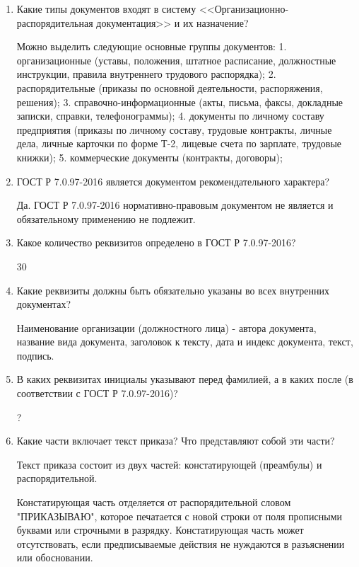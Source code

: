 \documentclass[a4paper,10pt]{article}
\theoremstyle{plain} %
\theoremstyle{definition} %
\theoremstyle{remark} %
\begin{document}
\begin{enumerate}

	\item Какие типы документов входят в систему <<Организационно-распорядительная документация>> и их назначение?
	
	Можно выделить следующие основные группы документов:
	1. организационные (уставы, положения, штатное расписание, должностные инструкции, правила внутреннего трудового распорядка);
	2. распорядительные (приказы по основной деятельности, распоряжения, решения);
	3. справочно-информационные (акты, письма, факсы, докладные записки, справки, телефонограммы);
	4. документы по личному составу предприятия (приказы по личному составу, трудовые контракты, личные дела, личные карточки по форме Т-2, лицевые счета по зарплате, трудовые книжки);
	5. коммерческие документы (контракты, договоры);
	

	\item ГОСТ Р 7.0.97-2016 является документом рекомендательного характера?
	
	Да. ГОСТ Р 7.0.97-2016 нормативно-правовым документом не является и обязательному применению не подлежит.

	\item Какое количество реквизитов определено в ГОСТ Р 7.0.97-2016?
	
	30

	\item Какие реквизиты должны быть обязательно указаны во всех внутренних
документах?

Наименование организации (должностного лица) - автора документа, название вида документа, заголовок к тексту, дата и индекс документа, текст, подпись.

	\item В каких реквизитах инициалы указывают перед фамилией, а в каких после (в соответствии с ГОСТ Р 7.0.97-2016)?
	
	?
	
	\item Какие части включает текст приказа? Что представляют собой эти части?
	
	Текст приказа состоит из двух частей: констатирующей (преамбулы) и распорядительной.
	
	Констатирующая часть отделяется от распорядительной словом "ПРИКАЗЫВАЮ", которое печатается с новой строки от поля прописными буквами или строчными в разрядку. Констатирующая часть может отсутствовать, если предписываемые действия не нуждаются в разъяснении или обосновании.
	

\end{enumerate}
\end{document}
